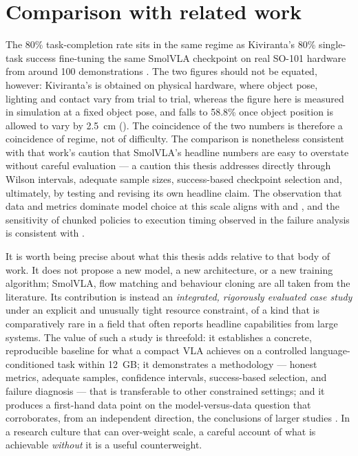 \section{Comparison with related work}
\label{sec:disc-compare}
The 80\% task-completion rate sits in the same regime as Kiviranta's 80\% single-task
success fine-tuning the same SmolVLA checkpoint on real SO-101 hardware from around
100 demonstrations \parencite{kiviranta2025smolvla}. The two figures should not be
equated, however: Kiviranta's is obtained on physical hardware, where object pose,
lighting and contact vary from trial to trial, whereas the figure here is measured in
simulation at a fixed object pose, and falls to 58.8\% once object position is allowed
to vary by \SI{2.5}{cm} (). The coincidence of the two
numbers is therefore a coincidence of regime, not of difficulty. The comparison is
nonetheless consistent with that work's caution that SmolVLA's headline numbers are
easy to overstate without careful evaluation --- a caution this thesis addresses
directly through Wilson intervals, adequate sample sizes, success-based checkpoint
selection and, ultimately, by testing and revising its own headline claim. The observation that
data and metrics dominate model choice at this scale aligns with
\textcite{black2025pi05} and \textcite{bharadhwaj2024roboagent}, and the sensitivity
of chunked policies to execution timing observed in the failure analysis is
consistent with \textcite{wang2026vlalimits}.

It is worth being precise about what this thesis adds relative to that body of work.
It does not propose a new model, a new architecture, or a new training algorithm;
SmolVLA, flow matching and behaviour cloning are all taken from the literature. Its
contribution is instead an \emph{integrated, rigorously evaluated case study} under an
explicit and unusually tight resource constraint, of a kind that is comparatively rare
in a field that often reports headline capabilities from large systems. The value of
such a study is threefold: it establishes a concrete, reproducible baseline for what a
compact VLA achieves on a controlled language-conditioned task within 12~GB; it
demonstrates a methodology --- honest metrics, adequate samples, confidence intervals,
success-based selection, and failure diagnosis --- that is transferable to other
constrained settings; and it produces a first-hand data point on the model-versus-data
question that corroborates, from an independent direction, the conclusions of larger
studies \parencite{black2025pi05, bharadhwaj2024roboagent}. In a research culture that
can over-weight scale, a careful account of what is achievable \emph{without} it is a
useful counterweight.

